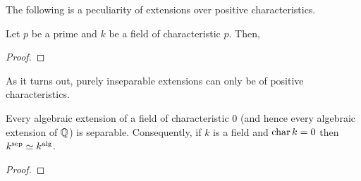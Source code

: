         The following is a peculiarity of extensions over positive characteristics. 
        \begin{proposition} \label{prop: purely_inseparable_polynomials}
            Let $p$ be a prime and $k$ be a field of characteristic $p$. Then, 
        \end{proposition}
            \begin{proof}
                
            \end{proof}
        \begin{definition} \label{def: purely_inseparable_extensions}
            
        \end{definition}
        \begin{definition} \label{def: perfect_fields}
            
        \end{definition}
        \begin{example} \label{example: perfections_are_purely_inseparable}
            
        \end{example}

        \begin{definition} \label{def: separable_closures}
            
        \end{definition}
        As it turns out, purely inseparable extensions can only be of positive characteristics. 
        \begin{lemma} \label{lemma: no_purely_inseparable_extensions_over_char_0}
            Every algebraic extension of a field of characteristic $0$ (and hence every algebraic extension of $\mathbb{Q}$) is separable. Consequently, if $k$ is a field and $\operatorname{char} k = 0$ then $k^{\mathrm{sep}} \simeq k^{\mathrm{alg}}$.
        \end{lemma}
            \begin{proof}
                
            \end{proof}

